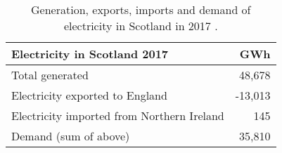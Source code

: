 \begin{table}[htbp]
	\caption{Generation, exports, imports and demand of electricity in Scotland in 2017 \citep{BEIS2018ElecUK}.}
	\label{tbl:elec_demand}
	\centering
	\begin{tabular}{@{}lr@{}}
		\toprule
		Electricity in Scotland 2017 & GWh \\ \midrule
		Total generated & 48,678 \\
		Electricity exported to England & -13,013 \\
		Electricity imported from Northern Ireland & 145 \\ \midrule
		Demand (sum of above) & 35,810 \\ \bottomrule
	\end{tabular}
\end{table}